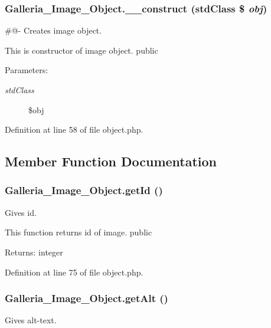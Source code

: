 \subsubsection{\setlength{\rightskip}{0pt plus 5cm}Galleria\_\-Image\_\-Object.\_\-\_\-construct (stdClass \$ {\em obj})}\label{classGalleria__Image__Object_9a58c8de7404f343a5283f929160d866}


\#@- Creates image object.

This is constructor of image object.  public \begin{Desc}
\item[Parameters:]
\begin{description}
\item[{\em stdClass}]\$obj \end{description}
\end{Desc}


Definition at line 58 of file object.php.

\subsection{Member Function Documentation}
\subsubsection{\setlength{\rightskip}{0pt plus 5cm}Galleria\_\-Image\_\-Object.getId ()}\label{classGalleria__Image__Object_e7776bc4b45060010b64e77f3abf2783}


Gives id.

This function returns id of image.  public \begin{Desc}
\item[Returns:]integer \end{Desc}


Definition at line 75 of file object.php.
\subsubsection{\setlength{\rightskip}{0pt plus 5cm}Galleria\_\-Image\_\-Object.getAlt ()}\label{classGalleria__Image__Object_2d6498c86c08f280e2426e728c387d8c}


Gives alt-text.

